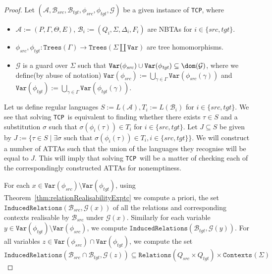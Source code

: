 \documentclass[12pt, a4paper]{article}
\newcommand{\metaTypecheckingProblem}{\texttt{TCP}}
\newcommand{\Alphabet}{\ensuremath{\Sigma}}
\newcommand{\Variables}{\texttt{Var}}
\newcommand{\Trees}[1]{\ensuremath{\texttt{Trees}\left(#1\right)}}
\newcommand{\Contexts}[2]{\ensuremath{\texttt{Contexts}_{#2}\left(#1\right)}}
\newcommand{\Transitions}{\ensuremath{\Delta}}
\newcommand{\substitution}{\ensuremath{\sigma}}
\newcommand{\Relations}{\texttt{Relations}}
\newcommand{\RealisableRelations}[2]{\ensuremath{\texttt{InducedRelations}\left(#1, #2\right)}}
\newcommand{\automaton}{\ensuremath{\mathcal{A}}}
\newcommand{\automatonB}{\ensuremath{\mathcal{B}}}
\newcommand{\guardFunction}{\ensuremath{\mathcal{G}}}
\newcommand{\guard}[1]{\ensuremath{\guardFunction(#1)}}
\newcommand{\seedLang}{S}
\newcommand{\stLang}{T}
\newcommand{\src}{\mathit{src}}
\newcommand{\sourceAutomatonB}{\ensuremath{\automatonB_{\src}}}
\newcommand{\sourceMap}{\ensuremath{\phi_{\src}}}
\newcommand{\tgt}{\mathit{tgt}}
\newcommand{\targetAutomatonB}{\ensuremath{\automatonB_{\tgt}}}
\newcommand{\targetMap}{\ensuremath{\phi_{\tgt}}}
\begin{document}
\begin{proof}
    Let $(\automaton, \sourceAutomatonB, \targetAutomatonB, \sourceMap, \targetMap, \guardFunction)$ be a given instance of \metaTypecheckingProblem, where
    \begin{itemize}
        \item $\automaton := (P, \Gamma, \Theta, E)$, $\automatonB_i := (Q_i, \Alphabet, \Transitions_i, F_i)$ are NBTAs for $i \in \{\src, \tgt\}$.
        \item $\sourceMap, \targetMap : \Trees{\Gamma} \to \Trees{\Alphabet\coprod\Variables}$ are tree homomorphisms.
        \item $\guardFunction$ is a guard over $\Alphabet$ such that $\Variables(\sourceMap) \cup \Variables(\targetMap) \subseteq \dom(\guardFunction)$, where we define(by abuse of notation) $\Variables(\sourceMap) := \bigcup_{\gamma \in \Gamma} \Variables(\sourceMap(\gamma))$ and $\Variables(\targetMap) := \bigcup_{\gamma \in \Gamma} \Variables(\targetMap(\gamma))$.
    \end{itemize}
    Let us define regular languages $\seedLang := L(\automaton), \stLang_i := L(\automatonB_i)$ for $i \in \{\src, \tgt\}$. We see that solving \metaTypecheckingProblem\ is equivalent to finding whether there exists $\tau \in \seedLang$ and a substitution $\substitution$ such that $\substitution(\phi_i(\tau)) \in \stLang_i$ for $i \in \{\src, \tgt\}$. Let $J \subseteq \seedLang$ be given by $J := \{\tau \in \seedLang \mid \exists\substitution\mbox{ such that }\substitution(\phi_i(\tau)) \in \stLang_i, i \in \{\src, \tgt\}\}$. We will construct a number of ATTAs such that the union of the languages they recognise will be equal to $J$. This will imply that solving \metaTypecheckingProblem\ will be a matter of checking each of the correspondingly constructed ATTAs for nonemptiness.

    For each $x \in \Variables(\sourceMap) \setminus \Variables(\targetMap)$, using Theorem~\ref{thm:relationRealisabilityExptc} we compute a priori, the set $\RealisableRelations{\sourceAutomatonB}{\guard{x}}$ of all the relations and corresponding contexts realisable by $\sourceAutomatonB$ under $\guard{x}$. Similarly for each variable $y \in \Variables(\targetMap) \setminus \Variables(\sourceMap)$, we compute $\RealisableRelations{\targetAutomatonB}{\guard{y}}$.
    For all variables $z \in \Variables(\sourceMap) \cap \Variables(\targetMap)$, we compute the set
    \[ \RealisableRelations{\sourceAutomatonB \cap \targetAutomatonB}{\guard{z}} \subseteq \Relations(Q_\src \times Q_\tgt) \times \Contexts{\Alphabet}{} \]
    

\end{proof}
\end{document}
